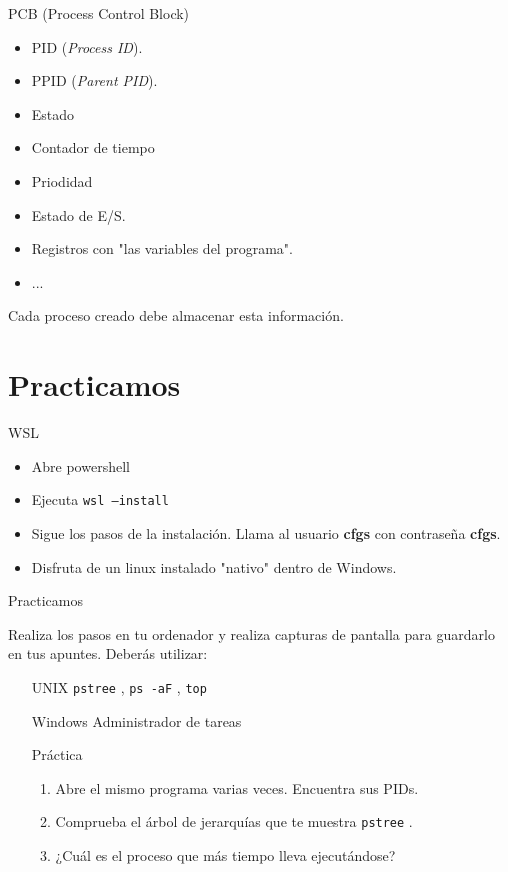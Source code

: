 \documentclass{beamer}
\newcommand{\code}[1]{%
  \colorbox{gray!10}{\texttt{#1}}%
}
\begin{document}
\begin{frame}{PCB (Process Control Block)}
        \begin{itemize}
            \item PID (\textit{Process ID}).
            \item PPID (\textit{Parent PID}).
            \item Estado
            \item Contador de tiempo
            \item Priodidad
            \item Estado de E/S.
            \item Registros con "las variables del programa".
            \item ...
        \end{itemize}
    Cada proceso creado debe almacenar esta información.
\end{frame}

\section{Practicamos}
\begin{frame}{WSL}
    \begin{itemize}
        \item Abre powershell
        \item Ejecuta \code{wsl --install}
        \item Sigue los pasos de la instalación. Llama al usuario \textbf{cfgs} con contraseña \textbf{cfgs}.
        \item Disfruta de un linux instalado "nativo" dentro de Windows.
    \end{itemize}
\end{frame}

\begin{frame}{Practicamos}

Realiza los pasos en tu ordenador y realiza capturas de pantalla para guardarlo en tus apuntes. Deberás utilizar:
\begin{itemize}
    \item[UNIX] \code{pstree}, \code{ps -aF}, \code{top}
    \item[Windows] Administrador de tareas
    \item[Práctica] \begin{enumerate}
        \item Abre el mismo programa varias veces. Encuentra sus PIDs.
        \item Comprueba el árbol de jerarquías que te muestra \code{pstree}.
        \item ¿Cuál es el proceso que más tiempo lleva ejecutándose?
    \end{enumerate}
\end{itemize}



\end{frame}
\end{document}

